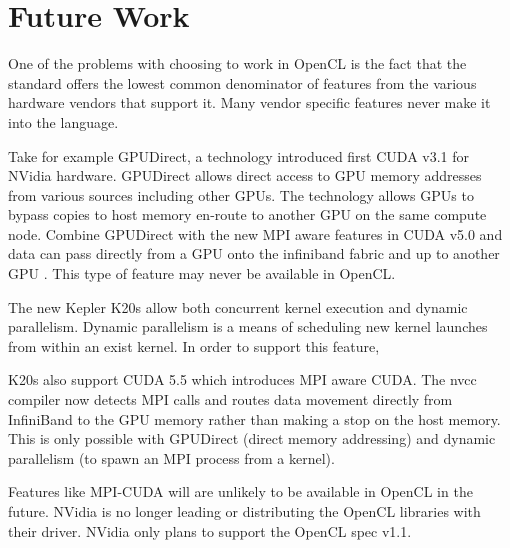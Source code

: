 \section{Future Work}

One of the problems with choosing to work in OpenCL is the fact that the standard offers the lowest common denominator of features from the various hardware vendors that support it. Many vendor specific features never make it into the language. 

Take for example GPUDirect, a technology introduced first CUDA v3.1 for NVidia hardware. GPUDirect allows direct access to GPU memory addresses from various sources including other GPUs. The technology allows GPUs to bypass copies to host memory en-route to another GPU on the same compute node. Combine GPUDirect with the new MPI aware features in CUDA v5.0 and data can pass directly from a GPU onto the infiniband fabric and up to another GPU \cite{NvidiaGPUMPI}. This type of feature may never be available in OpenCL. 

The new Kepler K20s allow both concurrent kernel execution and dynamic parallelism. Dynamic parallelism is a means of scheduling new kernel launches from within an exist kernel. In order to support this feature,

K20s also support CUDA 5.5 which introduces MPI aware CUDA. The nvcc compiler now detects MPI calls and routes data movement directly from InfiniBand to the GPU memory rather than making a stop on the host memory. This is only possible with GPUDirect (direct memory addressing) and dynamic parallelism (to spawn an MPI process from a kernel). 

Features like MPI-CUDA will are unlikely to be available in OpenCL in the future. NVidia is no longer leading or distributing the OpenCL libraries with their driver. NVidia only plans to support the OpenCL spec v1.1.


